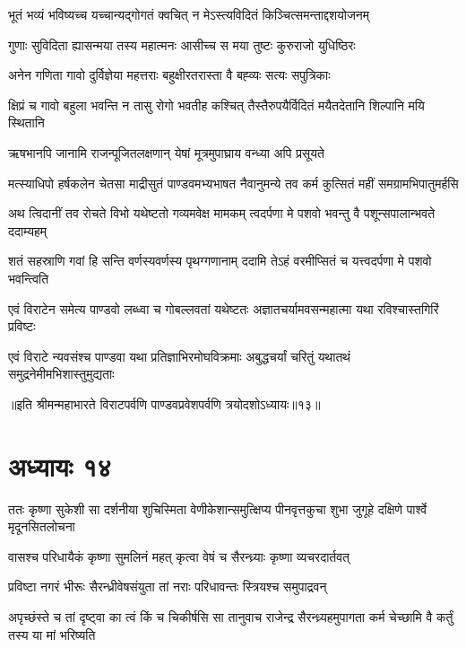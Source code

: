 \twolineshloka
{भूतं भव्यं भविष्यच्च यच्चान्यद्गोगतं क्वचित्}
{न मेऽस्त्यविदितं किञ्चित्समन्ताद्दशयोजनम्}


\twolineshloka
{गुणाः सुविदिता ह्यासन्मया तस्य महात्मनः}
{आसीच्च स मया तुष्टः कुरुराजो युधिष्ठिरः}


\twolineshloka
{अनेन गणिता गावो दुर्विज्ञेया महत्तराः}
{बहुक्षीरतरास्ता वै बह्व्यः सत्यः सपुत्रिकाः}


\twolineshloka
{क्षिप्रं च गावो बहुला भवन्ति न तासु रोगो भवतीह कश्चित्}
{तैस्तैरुपयैर्विदितं मयैतदेतानि शिल्पानि मयि स्थितानि}


\twolineshloka
{ऋषभानपि जानामि राजन्पूजितलक्षणान्}
{येषां मूत्रमुपाघ्राय वन्ध्या अपि प्रसूयते}



\twolineshloka
{मत्स्याधिपो हर्षकलेन चेतसा माद्रीसुतं पाण्डवमभ्यभाषत}
{नैवानुमन्ये तव कर्म कुत्सितं महीं समग्रामभिपातुमर्हसि}


\twolineshloka
{अथ त्विदानीं तव रोचते विभो यथेष्टतो गव्यमवेक्ष मामकम्}
{त्वदर्पणा मे पशवो भवन्तु वै पशून्सपालान्भवते ददाम्यहम्}


\twolineshloka
{शतं सहस्राणि गवां हि सन्ति वर्णस्यवर्णस्य पृथग्गणानाम्}
{ददामि तेऽहं वरमीप्सितं च यत्त्वदर्पणा मे पशवो भवन्त्विति}



\twolineshloka
{एवं विराटेन समेत्य पाण्डवो लब्ध्वा च गोबल्लवतां यथेष्टतः}
{अज्ञातचर्यामवसन्महात्मा यथा रविश्चास्तगिरिं प्रविष्टः}


\twolineshloka
{एवं विराटे न्यवसंश्च पाण्डवा यथा प्रतिज्ञाभिरमोघविक्रमाः}
{अबुद्धचर्यां चरितुं यथातथं समुद्रनेमीमभिशास्तुमुद्यताः}

॥इति श्रीमन्महाभारते विराटपर्वणि पाण्डवप्रवेशपर्वणि त्रयोदशोऽध्यायः॥१३॥

\chapter{अध्यायः १४}

\threelineshloka
{ततः कृष्णा सुकेशी सा दर्शनीया शुचिस्मिता}
{वेणीकेशान्समुत्क्षिप्य पीनवृत्तकुचा शुभा}
{जुगूहे दक्षिणे पार्श्वे मृदूनसितलोचना}


\twolineshloka
{वासश्च परिधायैकं कृष्णा सुमलिनं महत्}
{कृत्वा वेषं च सैरन्ध्र्याः कृष्णा व्यचरदार्तवत्}


\twolineshloka
{प्रविष्टा नगरं भीरूः सैरन्ध्रीवेषसंयुता}
{तां नराः परिधावन्तः स्त्रियश्च समुपाद्रवन्}


\threelineshloka
{अपृच्छंस्ते च तां दृष्ट्वा का त्वं किं च चिकीर्षसि}
{सा तानुवाच राजेन्द्र सैरन्ध्र्यहमुपागता}
{कर्म चेच्छामि वै कर्तुं तस्य या मां भरिष्यति}


